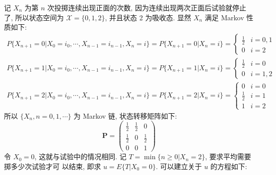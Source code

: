 \documentclass[boxes]{homework}
\begin{document}
\begin{solution}
    记 $X_n$ 为第 $n$ 次投掷连续出现正面的次数, 因为连续出现两次正面后试验就停止了, 所以状态空间为
    $\mathcal{X} = \{0, 1, 2\}$, 并且状态 2 为吸收态. 显然 $X_n$ 满足 Markov 性质如下:
    \begin{equation}
        \begin{gathered}
            P\{X_{n + 1} = 0 \vert X_0 = i_0, \cdots, X_{n - 1} = i_{n - 1}, X_n = i\}
            = P\{X_{n + 1} = 0 \vert X_n = i\} = \begin{cases}
                \frac{1}{2} & i = 0, 1 \\
                0           & i = 2
            \end{cases}\\
            P\{X_{n + 1} = 1 \vert X_0 = i_0, \cdots, X_{n - 1} = i_{n - 1}, X_n = i\}
            = P\{X_{n + 1} = 1 \vert X_n = i\} = \begin{cases}
                \frac{1}{2} & i = 0    \\
                0           & i = 1, 2
            \end{cases}\\
            P\{X_{n + 1} = 2 \vert X_0 = i_0, \cdots, X_{n - 1} = i_{n - 1}, X_n = i\}
            = P\{X_{n + 1} = 2 \vert X_n = i\} = \begin{cases}
                0           & i = 0 \\
                \frac{1}{2} & i = 1 \\
                1           & i = 2
            \end{cases}
        \end{gathered}
    \end{equation}
    所以 $\{X_n, n = 0, 1, \cdots\}$ 为 Markov 链, 状态转移矩阵如下:
    \begin{equation}
        \boldsymbol{P} = \begin{pmatrix}
            \frac{1}{2} & \frac{1}{2} & 0           \\
            \frac{1}{2} & 0           & \frac{1}{2} \\
            0           & 0           & 1
        \end{pmatrix}
    \end{equation}
    令 $X_0 = 0$, 这就与试验中的情况相同. 记 $T = \min\{n \ge 0 \vert X_n = 2\}$, 要求平均需要掷多少次试验才可
    以结束, 即求 $u = E\{T \vert X_0 = 0\}$. 可以建立关于 $u$ 的方程如下:
    \begin{equation} \label{eq:5.3}
        \begin{aligned}

\end{aligned}
\end{equation}
\end{solution}
\end{document}
